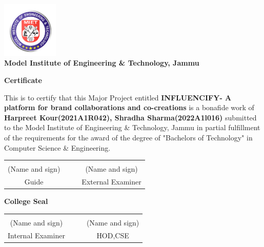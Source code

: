     \begin{center}
 
        \vspace*{0.1cm}
        \large
        \begin{flushright}
        \end{flushright}
        
    \includegraphics[width=0.2\textwidth]{Images/miet_round_logo.png}\\
        \textbf{Model Institute of Engineering \& Technology, Jammu}
        
        \vspace{0.8cm}
        
        \large
        \textbf{Certificate}\\
        \vspace{0.5cm}
        
    \end{center}
\noindent
{\large This is to certify that this Major Project  entitled \textbf{INFLUENCIFY- A platform for brand collaborations and co-creations} is a bonafide work of \textbf{Harpreet Kour(2021A1R042), Shradha Sharma(2022A1l016)} submitted to the Model Institute of Engineering \& Technology, Jammu in partial fulfillment of the requirements for the award of the degree of "Bachelors of Technology" in Computer Science \& Engineering.}
\vspace{2cm}

\begin{table}[h]
\centering
\begin{tabular}{cp{2cm}p{2cm}c}
\hrulefill & & & \hrulefill \\
\large (Name and sign) & & & \large (Name and sign) \\
\large Guide & & & \large External Examiner \\
\end{tabular}
\end{table}

\centering \textbf{College Seal}\\
  \vspace{2cm}

\begin{table}[h]
\centering
\begin{tabular}{cp{2cm}p{2cm}c}
\hrulefill & & & \hrulefill  \\
\large (Name and sign) & & &\large (Name and sign) \\
\large Internal Examiner & &  & \large HOD,CSE \\
\end{tabular}
\end{table}

\vspace{1cm}
\noindent


